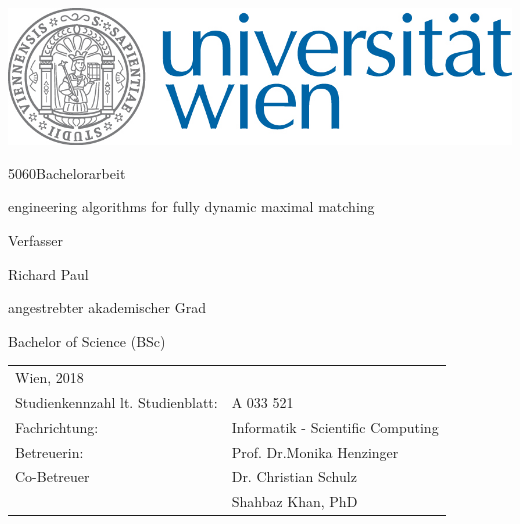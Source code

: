 \documentclass{article}      %
\makeatletter
\newcommand\HUGE{\@setfontsize\Huge{50}{60}}
\makeatother
\begin{document}
\thispagestyle{empty}
\begin{center}
\begin{minipage}{0.9\linewidth}
\flushright
	      		 
    \includegraphics[width=0.5\linewidth]{univie.jpg}\par
    \vspace{1cm}
\centering 	
	{\scshape{\HUGE Bachelorarbeit\par}}
	\vspace{1cm}
    {\scshape{\Large engineering algorithms for fully dynamic maximal matching\par}}
    \vspace{2cm}
    
  
 Verfasser  \linebreak
 {\Large Richard Paul\par}
 	\vspace{1.5cm}
angestrebter akademischer Grad\linebreak
 {\Large Bachelor of Science (BSc)\par}
	\vspace{1.5cm}

\flushleft
	

\begin{tabular}{ll}
Wien, 2018 \linebreak
\vspace{1cm}&   \\
  Studienkennzahl lt. Studienblatt: & A 033 521 \vspace{0.2cm} \\ 
  Fachrichtung: & Informatik  -  Scientific Computing \vspace{0.2cm} \\
  Betreuerin: & Prof. Dr.Monika Henzinger \vspace{0.2cm} \\
  Co-Betreuer & Dr. Christian Schulz \vspace{0.1cm} \\
  & Shahbaz Khan, PhD
  \end{tabular}


    
    
\end{minipage}
\end{center}
\clearpage
\end{document}
